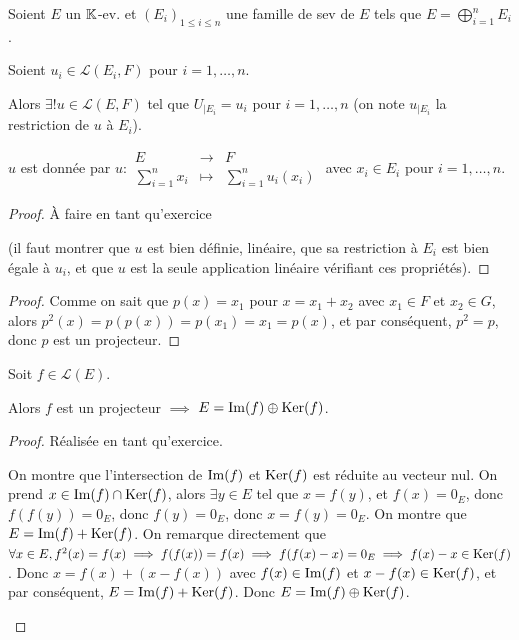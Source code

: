 \documentclass[12pt,a4paper]{report}
\begin{document}
\begin{property}
    Soient $E$ un $\mathbb{K}$-ev. et $(E_i)_{1\le i \le n}$ une famille de sev de $E$ tels que $E = \bigoplus_{i=1}^n E_i$.

    Soient $u_i \in \mathcal L(E_i,F)$ pour $i=1,\dots,n$.

    Alors $\exists! u \in \mathcal L(E,F)$ tel que $U_{|E_i} = u_i$ pour $i=1,\dots,n$ (on note $u_{|E_i}$ la restriction de $u$ à $E_i$).

    $u$ est donnée par $u : \begin{matrix}
    E &\to &F\\
    \sum_{i=1}^n x_i &\mapsto &\sum_{i=1}^n u_i(x_i)
    \end{matrix}$ avec $x_i \in E_i$ pour $i=1,\dots,n$.
\end{property}

\begin{proof}
    À faire en tant qu'exercice

    (il faut montrer que $u$ est bien définie, linéaire, que sa restriction à $E_i$ est bien égale à $u_i$, et que $u$ est la seule application linéaire vérifiant ces propriétés).
\end{proof}

\begin{proof}
    Comme on sait que $p(x) = x_1$ pour $x = x_1 + x_2$ avec $x_1 \in F$ et $x_2 \in G$, alors $p^2(x) = p(p(x)) = p(x_1) = x_1 = p(x)$, et par conséquent, $p^2 = p$, donc $p$ est un projecteur.
\end{proof}

\begin{property}
    Soit $f \in \mathcal L(E)$.
    
    Alors $f$ est un projecteur $\implies$ $E = \mathrm{Im}(f) \oplus \mathrm{Ker}(f)$.
\end{property}

\begin{proof}
    Réalisée en tant qu'exercice.

    \begin{outline}
        \1 On montre que l'intersection de $\mathrm{Im}(f)$ et $\mathrm{Ker}(f)$ est réduite au vecteur nul.
        \2 On prend $x \in \mathrm{Im}(f) \cap \mathrm{Ker}(f)$, alors $\exists y \in E$ tel que $x = f(y)$, et $f(x) = 0_E$, donc $f(f(y)) = 0_E$, donc $f(y) = 0_E$, donc $x = f(y) = 0_E$.
        \1 On montre que $E = \mathrm{Im}(f) + \mathrm{Ker}(f)$.
        \2 On remarque directement que $\forall x \in E, f^2(x) = f(x) \implies f(f(x)) = f(x) \implies f(f(x)-x)=0_E \implies f(x)-x \in \mathrm{Ker}(f)$. Donc $x = f(x) + (x - f(x))$ avec $f(x) \in \mathrm{Im}(f)$ et $x - f(x) \in \mathrm{Ker}(f)$, et par conséquent, $E = \mathrm{Im}(f) + \mathrm{Ker}(f)$.
        \1 Donc $E = \mathrm{Im}(f) \oplus \mathrm{Ker}(f)$.
    \end{outline}
\end{proof}
\end{document}
